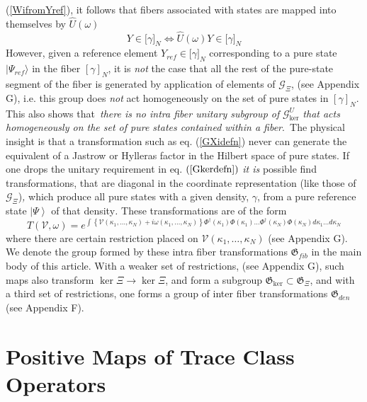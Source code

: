 \documentclass[aps,preprint]{revtex4}%
\begin{document}
(\ref{WifromYref}), it follows that fibers associated with states are mapped
into themselves by $\hat{U}(\omega)$
\begin{equation}
Y\in\lbrack\gamma]_{N}\Leftrightarrow\hat{U}(\omega)Y\in\lbrack\gamma]_{N}%
\end{equation}
However, given a reference element $Y_{ref}\in\lbrack\gamma]_{N}$
corresponding to a pure state $|\Psi_{ref}\rangle$ in the fiber $[\gamma]_{N}%
$, it is \emph{not} the case that all the rest of the pure-state segment of
the fiber is generated by application of elements of $\mathcal{G}_{\Xi}$, (see
Appendix G), i.e. this group does \emph{not }act homogeneously on the set of
pure states in $[\gamma]_{N}$. This also shows that\emph{\ there is no intra
fiber unitary subgroup of }$\mathcal{G}_{\ker}^{U}$ \emph{that acts
homogeneously on the set of pure states contained within a fiber}.\emph{\ }The
physical insight is that a transformation such as eq. (\ref{GXidefn}) never
can generate the equivalent of a Jastrow or Hylleras factor in the Hilbert
space of pure states. If one drops the unitary requirement in eq. $\left(
\ref{Gkerdefn}\right)  $ \textit{it is} possible find transformations, that
are diagonal in the coordinate representation (like those of $\mathcal{G}%
_{\Xi}$)\textit{, }which produce all pure states with a given density,
$\gamma$, from a pure reference state $\left|  \Psi\right\rangle $ of that
density\textit{. }These transformations are of the form%
\begin{equation}
T\left(  \mathcal{V},\omega\right)  =e^{\int\left\{  \mathcal{V}(\kappa
_{1},\ldots,\kappa_{N})+i\omega(\kappa_{1},\ldots,\kappa_{N})\right\}
\Phi^{\dagger}(\kappa_{1})\Phi(\kappa_{1})\ldots\Phi^{\dagger}(\kappa_{N}%
)\Phi(\kappa_{N})d\kappa_{1}\ldots d\kappa_{N}}%
\end{equation}
where there are certain restriction placed on $\mathcal{V}(\kappa_{1}%
,\ldots,\kappa_{N})$ (see Appendix G). We denote the group formed by these
intra fiber transformations $\mathfrak{G}_{fib}$ in the main body of this
article. With a weaker set of restrictions, (see Appendix G), such maps also
transform $\ker\Xi\rightarrow\ker\Xi$, and form a subgroup $\mathfrak{G}%
_{\ker}\subset\mathfrak{G}_{\Xi}$, and with a third set of restrictions, one
forms a group of inter fiber transformations $\mathfrak{G}_{den}$ (see
Appendix F).

\section{Positive Maps of Trace Class Operators}
\end{document}
